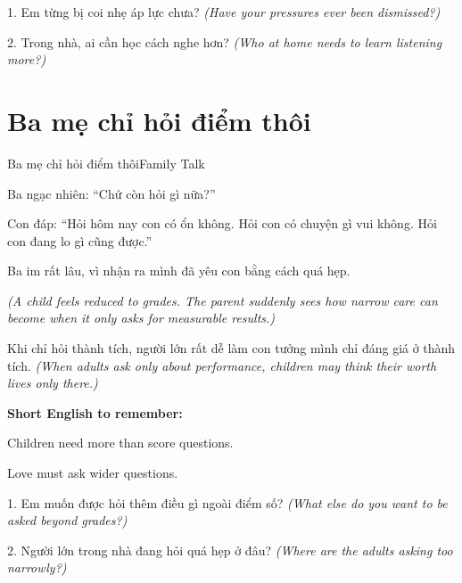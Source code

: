 \begin{tuhocnhanh}
1. Em từng bị coi nhẹ áp lực chưa? \textit{(Have your pressures ever been dismissed?)}

2. Trong nhà, ai cần học cách nghe hơn? \textit{(Who at home needs to learn listening more?)}
\end{tuhocnhanh}
\ngancach

\section{Ba mẹ chỉ hỏi điểm thôi}
\begin{truyen}{Ba mẹ chỉ hỏi điểm thôi}{Family Talk}

Ba ngạc nhiên: ``Chứ còn hỏi gì nữa?''

Con đáp: ``Hỏi hôm nay con có ổn không. Hỏi con có chuyện gì vui không. Hỏi con đang lo gì cũng được.''

Ba im rất lâu, vì nhận ra mình đã yêu con bằng cách quá hẹp.

\textit{(A child feels reduced to grades. The parent suddenly sees how narrow care can become when it only asks for measurable results.)}
\end{truyen}

\begin{baihoc}
Khi chỉ hỏi thành tích, người lớn rất dễ làm con tưởng mình chỉ đáng giá ở thành tích.
\textit{(When adults ask only about performance, children may think their worth lives only there.)}
\end{baihoc}

\begin{ghinhoanh}
\textbf{Short English to remember:}

Children need more than score questions.

Love must ask wider questions.
\end{ghinhoanh}

\begin{tuhocnhanh}
1. Em muốn được hỏi thêm điều gì ngoài điểm số? \textit{(What else do you want to be asked beyond grades?)}

2. Người lớn trong nhà đang hỏi quá hẹp ở đâu? \textit{(Where are the adults asking too narrowly?)}
\end{tuhocnhanh}
\ngancach

